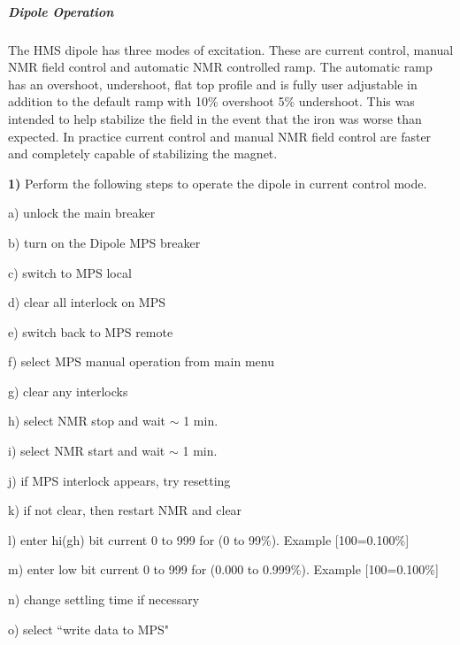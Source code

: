 \subparagraph{Dipole Operation}

\begin{description}
\item{}\hskip0.3in The HMS dipole has three modes of excitation. These are
current control, manual NMR field control and automatic NMR controlled ramp.
The automatic ramp has an overshoot, undershoot, flat top profile and is
fully user adjustable in addition to the default ramp with 10\%
overshoot 5\% undershoot.  This was intended to help stabilize the field
in the event that the iron was worse than expected.  In practice current
control and manual NMR field control are faster and completely capable
of stabilizing the magnet.
\end{description}

\begin{description}
\item{\hskip0.3in \bf 1)}\hskip0.1in Perform the following steps to
operate the
dipole in current control mode.
\end{description}

\begin{description}
\item{}\hskip0.5in a) unlock the main breaker
\item{}\hskip0.5in b) turn on the Dipole MPS breaker
\item{}\hskip0.5in c) switch to MPS local
\item{}\hskip0.5in d) clear all interlock on MPS
\item{}\hskip0.5in e) switch back to MPS remote
\item{}\hskip0.5in f) select MPS manual operation from main menu
\item{}\hskip0.5in g) clear any interlocks
\item{}\hskip0.5in h) select NMR stop and wait $\sim$ 1 min.
\item{}\hskip0.5in i) select NMR start and wait $\sim$ 1 min.
\item{}\hskip0.5in j) if MPS interlock appears, try resetting
\item{}\hskip0.5in k) if not clear, then restart NMR and clear
\item{}\hskip0.5in l) enter hi(gh) bit current 0 to 999 for (0 to 99\%).  Example
[100=0.100\%]
\item{}\hskip0.5in m) enter low bit current 0 to 999 for (0.000 to 0.999\%).
Example [100=0.100\%]
\item{}\hskip0.5in n) change settling time if necessary
\item{}\hskip0.5in o) select ``write data to MPS"
\end{description}


